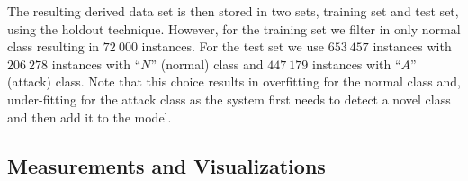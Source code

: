 The resulting derived data set is then stored in two sets,
training set and test set, using the holdout technique.
However, for the training set we filter in only normal class
resulting in $72\:000$ instances.
For the test set we use $653\:457$ instances with
$206\:278$ instances with ``$N$'' (normal) class and
$447\:179$ instances with ``$A$'' (attack) class.
Note that this choice results in overfitting for the normal class and,
under-fitting for the attack class as the system first needs to detect a novel class and
then add it to the model.








\subsection{Measurements and Visualizations}

